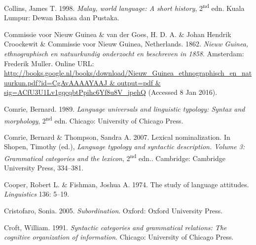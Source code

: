 \begin{styleCitaviBibliographyEntry}
Collins, James T. 1998. \textit{Malay, world language: A short history}, 2\textsuperscript{nd} edn. Kuala Lumpur: Dewan Bahasa dan Pustaka.
\end{styleCitaviBibliographyEntry}

\begin{styleCitaviBibliographyEntry}
Commissie voor Nieuw Guinea \& van der Goes, H. D. A. \& Johan Hendrik Croockewit \& Commissie voor Nieuw Guinea, Netherlands. 1862. \textit{Nieuw Guinea, ethnographisch en natuurkundig onderzocht en beschreven in 1858}. Amsterdam: Frederik Muller. Online URL: \url{http://books.google.nl/books/download/Nieuw_Guinea_ethnographisch_en_natuurkun.pdf?id=CgAvAAAAYAAJ & output=pdf & sig=ACfU3U1Lv1gqcqbtPpihc6Yf8u8V_ipehQ} (Accessed 8 Jan 2016).
\end{styleCitaviBibliographyEntry}

\begin{styleCitaviBibliographyEntry}
Comrie, Bernard. 1989. \textit{Language universals and linguistic typology: Syntax and morphology}, 2\textsuperscript{nd} edn. Chicago: University of Chicago Press.
\end{styleCitaviBibliographyEntry}

\begin{styleCitaviBibliographyEntry}
Comrie, Bernard \& Thompson, Sandra A. 2007. Lexical nominalization. In Shopen, Timothy (ed.), \textit{Language typology and syntactic description. Volume 3: Grammatical categories and the lexicon}, 2\textsuperscript{nd} edn.. Cambridge: Cambridge University Press, 334–381.
\end{styleCitaviBibliographyEntry}

\begin{styleCitaviBibliographyEntry}
Cooper, Robert L. \& Fishman, Joshua A. 1974. The study of language attitudes. \textit{Linguistics} 136: 5–19.
\end{styleCitaviBibliographyEntry}

\begin{styleCitaviBibliographyEntry}
Cristofaro, Sonia. 2005. \textit{Subordination}. Oxford: Oxford University Press.
\end{styleCitaviBibliographyEntry}

\begin{styleCitaviBibliographyEntry}
Croft, William. 1991. \textit{Syntactic categories and grammatical relations: The cognitive organization of information}. Chicago: University of Chicago Press.
\end{styleCitaviBibliographyEntry}

